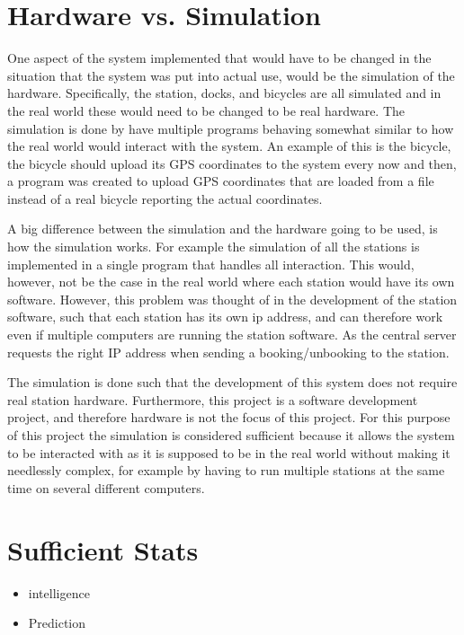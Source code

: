\section*{Hardware vs. Simulation}
One aspect of the system implemented that would have to be changed in the situation that the system was put into actual use, would be the simulation of the hardware.
Specifically, the station, docks, and bicycles are all simulated and in the real world these would need to be changed to be real hardware.
The simulation is done by have multiple programs behaving somewhat similar to how the real world would interact with the system.
An example of this is the bicycle, the bicycle should upload its GPS coordinates to the system every now and then, a program was created to upload GPS coordinates that are loaded from a file instead of a real bicycle reporting the actual coordinates.

A big difference between the simulation and the hardware going to be used, is how the simulation works.
For example the simulation of all the stations is implemented in a single program that handles all interaction. 
This would, however, not be the case in the real world where each station would have its own software.
However, this problem was thought of in the development of the station software, such that each station has its own ip address, and can therefore work even if multiple computers are running the station software. As the central server requests the right IP address when sending a booking/unbooking to the station.

The simulation is done such that the development of this system does not require real station hardware.
Furthermore, this project is a software development project, and therefore hardware is not the focus of this project.
For this purpose of this project the simulation is considered sufficient because it allows the system to be interacted with as it is supposed to be in the real world without making it needlessly complex, for example by having to run multiple stations at the same time on several different computers.

\section*{Sufficient Stats}
	\begin{itemize}
		\item intelligence
		\item Prediction
	\end{itemize}